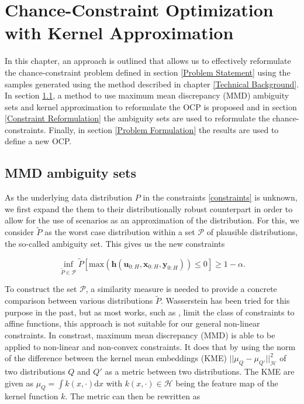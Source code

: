 \chapter{Chance-Constraint Optimization with Kernel Approximation} \label{Technical Approach}

In this chapter, an approach is outlined that allows us to effectively reformulate the chance-constraint problem defined in section \ref{Problem Statement} using the samples generated using the method described in chapter \ref{Technical Background}. In section \ref{SubSec:MMD}, a method to use maximum mean discrepancy (MMD) ambiguity sets and kernel approximation to reformulate the OCP is proposed and in section \ref{Constraint Reformulation} the ambiguity sets are used to reformulate the chance-constraints. Finally, in section \ref{Problem Formulation} the results are used to define a new OCP.

\section{MMD ambiguity sets} \label{SubSec:MMD}

As the underlying data distribution $P$ in the constraints \eqref{constraints} is unknown, we first expand the them to their distributionally robust counterpart in order to allow for the use of scenarios as an approximation of the distribution. For this, we consider $\tilde{P}$ as the worst case distribution within a set $\mathcal{P}$ of plausible distributions, the so-called ambiguity set. This gives us the new constraints

\begin{equation} \label{wc constraints}
\inf\limits_{\tilde{P} \in \mathcal{P}}\tilde{P} \left[ \text{max}(\boldsymbol{h}(\boldsymbol{u}_{0:H},  \boldsymbol{x}_{0:H},  \boldsymbol{y}_{0:H})) \leq 0 \right] \geq 1 - \alpha.
\end{equation}

To construct the set $\mathcal{P}$, a similarity measure is needed to provide a concrete comparison between various distributions $\tilde{P}$. Wasserstein has been tried for this purpose in the past, but as most works, such as \cite{Hota_19}, limit the class of constraints to affine functions, this approach is not suitable for our general non-linear constraints. In constrast, maximum mean discrepancy (MMD) \cite{Arthur_12} is able to be applied to non-linear and non-convex constraints. It does that by using the norm of the difference between the kernel mean embeddings (KME) $|| \mu_Q - \mu_{Q'} ||^2_{\mathcal{H}}$ of two distributions $Q$ and $Q'$ as a metric between two distributions. The KME are given as $\mu_Q = \int k(x, \cdot) \text{d}x$ with $k(x, \cdot) \in \mathcal{H}$ being the feature map of the kernel function $k$. The metric can then be rewritten as 

